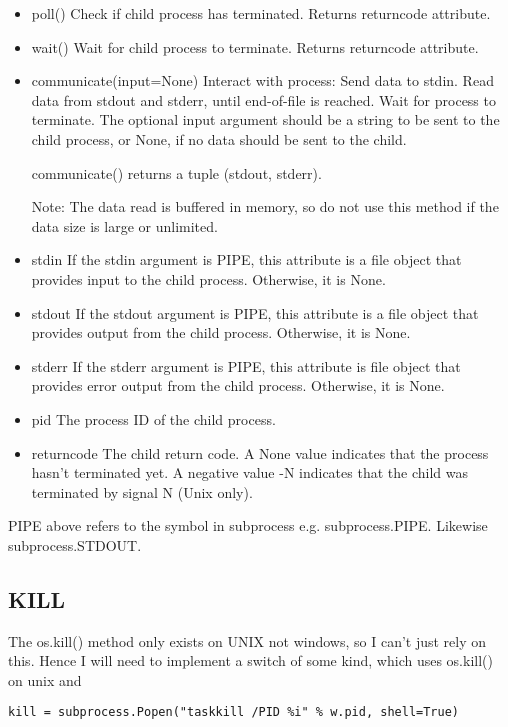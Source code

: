 \documentclass[a4paper, 11pt]{article}
\begin{document}
\begin{itemize}
\item{poll()
    Check if child process has terminated. Returns returncode attribute. 
}
\item{
wait()
    Wait for child process to terminate. Returns returncode attribute. 
}
\item{
communicate(input=None)
    Interact with process: Send data to stdin. Read data from stdout and 
stderr, until end-of-file is reached. Wait for process to terminate. The 
optional input argument should be a string to be sent to the child process, 
or None, if no data should be sent to the child.

    communicate() returns a tuple (stdout, stderr).

    Note: The data read is buffered in memory, so do not use this method if 
the data size is large or unlimited. 
}

\item{
stdin
    If the stdin argument is PIPE, this attribute is a file object that 
provides input to the child process. Otherwise, it is None. 
}
\item{
stdout
    If the stdout argument is PIPE, this attribute is a file object that 
provides output from the child process. Otherwise, it is None. 
}
\item{
stderr
    If the stderr argument is PIPE, this attribute is file object that 
provides error output from the child process. Otherwise, it is None. 
}
\item{
pid
    The process ID of the child process. 
}
\item{
returncode
    The child return code. A None value indicates that the process hasn't 
terminated yet. A negative value -N indicates that the child was terminated 
by signal N (Unix only). 
}
\end{itemize}

PIPE above refers to the symbol in subprocess e.g. subprocess.PIPE. Likewise
subprocess.STDOUT.

\subsection{KILL}

The os.kill() method only exists on UNIX not windows, so I can't just rely
on this. Hence I will need to implement a switch of some kind, which uses
os.kill() on unix and 

\begin{verbatim}
kill = subprocess.Popen("taskkill /PID %i" % w.pid, shell=True)
\end{verbatim}
\end{document}
